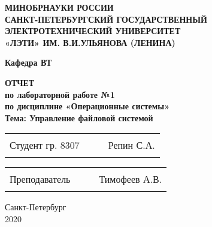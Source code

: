 \begin{titlepage}
\begin{center}
    \uppercase{\textbf{Минобрнауки России\\
            Санкт-Петербургский государственный\\
            электротехнический университет\\
            «ЛЭТИ» им. В.И.Ульянова (Ленина)
    }}
    \vspace{0.25cm}

    \textbf{Кафедра ВТ}
    \vfill

    \uppercase{\textbf{\large{
        Отчет
    }}}
    \\
    \textbf{\large{
      по лабораторной работе №1\\
      по дисциплине «Операционные системы»\\
      Тема: Управление файловой системой\\
      \vspace{0.5cm}
    }}
  \bigskip
\end{center}
\vfill

\begin{tabularx}{\textwidth}{@{}lcXr}
    Студент гр. 8307 & \hspace{1.6cm} & \rule{5cm}{1pt} & Репин С.А.
\end{tabularx}

\vspace{0.5cm}

\noindent
\begin{tabularx}{\textwidth}{@{}lcXr}
    Преподаватель & \hspace{2cm} & \rule{5cm}{1pt} & Тимофеев А.В.
\end{tabularx}

\hfill \break
\hfill \break

\begin{center}
  Санкт-Петербург\\2020
\end{center}

\end{titlepage}

